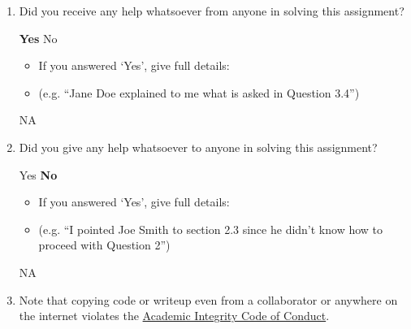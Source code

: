 \documentclass[11pt,addpoints,answers]{exam}
\numberwithin{equation}{section} %
\numberwithin{figure}{section} %
\numberwithin{table}{section} %
\begin{document}
\begin{enumerate}
    \item Did you receive any help whatsoever from anyone in solving this assignment?
    \begin{checkboxes}
     \choice \textbf{Yes}
     \choice No
    \end{checkboxes}
    \begin{itemize}
        \item If you answered `Yes', give full details:
        \item (e.g. “Jane Doe explained to me what is asked in Question 3.4”)
    \end{itemize}

    \begin{tcolorbox}[fit,height=3cm,blank, borderline={1pt}{-2pt},nobeforeafter]
    NA
    \end{tcolorbox}

    \item Did you give any help whatsoever to anyone in solving this assignment?
    \begin{checkboxes}
     \choice Yes
     \choice \textbf{No}\
    \end{checkboxes}
    \begin{itemize}
        \item If you answered `Yes', give full details:
        \item (e.g. “I pointed Joe Smith to section 2.3 since he didn’t know how to proceed with Question 2”)
    \end{itemize}

    \begin{tcolorbox}[fit,height=3cm,blank, borderline={1pt}{-2pt},nobeforeafter]
    NA
    \end{tcolorbox}

    \item Note that copying code or writeup even from a collaborator or anywhere on the internet violates the \href{hhttps://www.cmu.edu/policies/student-and-student-life/academic-integrity.html}{Academic Integrity Code of Conduct}.
\end{enumerate}
\end{document}
